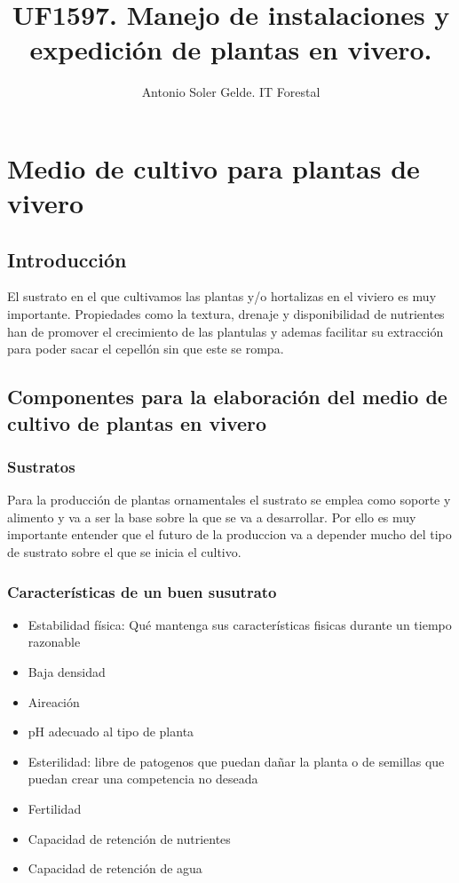 \documentclass[a4paper,12pt,oneside]{article}
\author{Antonio Soler Gelde. IT Forestal}
\date{}
\title{UF1597. Manejo de instalaciones y expedición de plantas en vivero.}
\begin{document}
\maketitle
\thispagestyle{empty} \tableofcontents \clearpage\section{Medio de cultivo para plantas de vivero}
\label{sec:org71fdd03}
\subsection{Introducción}
\label{sec:org0ae2db9}
El sustrato en el que cultivamos las plantas y/o hortalizas en el viviero es muy
importante. Propiedades como la textura, drenaje y disponibilidad de nutrientes
han de promover el crecimiento de las plantulas y ademas facilitar su extracción
para poder sacar el cepellón sin que este se rompa.
\subsection{Componentes para la elaboración del medio de cultivo de plantas en vivero}
\label{sec:org949e834}
\subsubsection{Sustratos}
\label{sec:orgc793a50}
Para la producción de plantas ornamentales el sustrato se emplea como soporte y
alimento y va a ser la base sobre la que se va a desarrollar. Por ello es muy
importante entender que el futuro de la produccion va a depender mucho del tipo
de sustrato sobre el que se inicia el cultivo. 
\subsubsection{Características de un buen susutrato}
\label{sec:org89d77ec}
\begin{itemize}
\item Estabilidad física: Qué mantenga sus características fisicas durante un
tiempo razonable
\item Baja densidad
\item Aireación
\item pH adecuado al tipo de planta
\item Esterilidad: libre de patogenos que puedan dañar la planta o de semillas que
puedan crear una competencia no deseada
\item Fertilidad
\item Capacidad de retención de nutrientes
\item Capacidad de retención de agua
\end{itemize}
\end{document}
